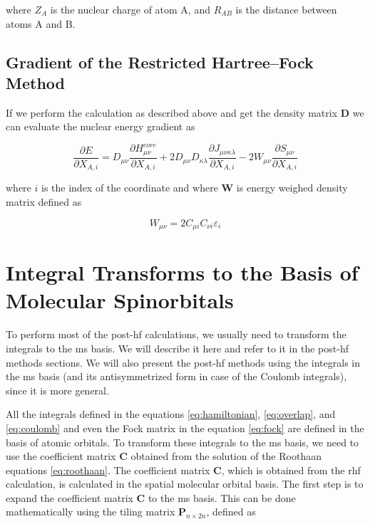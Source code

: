 \documentclass[open=any,parskip=half,11pt]{scrbook}
\begin{document}
where \(Z_A\) is the nuclear charge of atom A, and \(R_{AB}\) is the distance between atoms A and B.

\subsection{Gradient of the Restricted Hartree--Fock Method}\label{gradient-of-the-restricted-hartreefock-method}

If we perform the calculation as described above and get the density matrix \(\mathbf{D}\) we can evaluate the nuclear energy gradient as

\begin{equation}
\frac{\partial E}{\partial X_{A,i}}=D_{\mu\nu}\frac{\partial H_{\mu\nu}^{core}}{\partial X_{A,i}}+2D_{\mu\nu}D_{\kappa\lambda}\frac{\partial J_{\mu\nu\kappa\lambda}}{\partial X_{A,i}}-2W_{\mu\nu}\frac{\partial S_{\mu\nu}}{\partial X_{A,i}}
\end{equation}

where \(i\) is the index of the coordinate and where \(\mathbf{W}\) is energy weighed density matrix defined as

\begin{equation}
W_{\mu\nu}=2C_{\mu i}C_{\nu i}\varepsilon_i
\end{equation}

\section{Integral Transforms to the Basis of Molecular Spinorbitals}\label{integral-transforms-to-the-basis-of-molecular-spinorbitals}

To perform most of the \acrfull{post-hf} calculations, we usually need to transform the integrals to the \acrshort{ms} basis. We will describe it here and refer to it in the \acrshort{post-hf} methods sections. We will also present the \acrshort{post-hf} methods using the integrals in the \acrshort{ms} basis (and its antisymmetrized form in case of the Coulomb integrals), since it is more general.

All the integrals defined in the equations \ref{eq:hamiltonian}, \ref{eq:overlap}, and \ref{eq:coulomb} and even the Fock matrix in the equation \ref{eq:fock} are defined in the basis of atomic orbitals. To transform these integrals to the \acrshort{ms} basis, we need to use the coefficient matrix \(\mathbf{C}\) obtained from the solution of the Roothaan equations \ref{eq:roothaan}. The coefficient matrix \(\mathbf{C}\), which is obtained from the \acrshort{rhf} calculation, is calculated in the spatial molecular orbital basis. The first step is to expand the coefficient matrix \(\mathbf{C}\) to the \acrshort{ms} basis. This can be done mathematically using the tiling matrix \(\mathbf{P}_{n\times 2n}\), defined as
\end{document}
